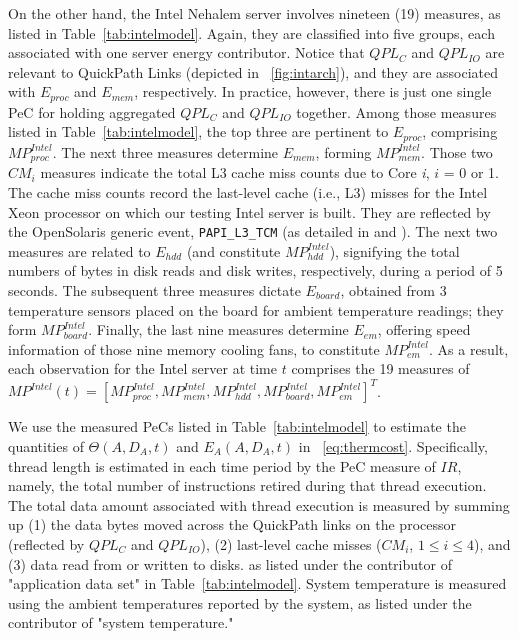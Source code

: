 On the other hand, the Intel Nehalem server involves nineteen (19) measures, as
listed in Table~\ref{tab:intelmodel}.  Again, they are classified into five
groups, each associated with one server energy contributor.
Notice that $QPL_{C}$ and $QPL_{IO}$ are relevant to QuickPath Links
(depicted in \figurename~\ref{fig:intarch}),
and they are associated with $E_{proc}$ and $E_{mem}$, respectively.
In practice, however, there is just one single PeC for holding aggregated
$QPL_{C}$ and $QPL_{IO}$ together.
Among those measures listed in Table~\ref{tab:intelmodel},
the top three are pertinent to $E_{proc}$, comprising $MP_{proc}^{Intel}$.
The next three measures determine $E_{mem}$, forming $MP_{mem}^{Intel}$.
Those two $CM_{i}$ measures indicate the total L3 cache miss counts
due to Core \textit{i}, $i$ = 0 or 1.
The cache miss counts record the last-level cache (i.e., L3) misses
for the Intel Xeon processor on which our testing Intel
server is built.  They are reflected by the OpenSolaris generic event,
\texttt{PAPI\_L3\_TCM} (as detailed in \cite{Sun2008b} and \cite{Intel2009}).
The next two measures are related to $E_{hdd}$ (and constitute $MP_{hdd}^{Intel}$),
signifying the total numbers of bytes in disk reads and disk writes,
respectively, during a period of 5 seconds.
The subsequent three measures dictate $E_{board}$, obtained
from 3 temperature sensors placed on the board for ambient temperature readings;
they form $MP_{board}^{Intel}$.
Finally, the last nine measures determine $E_{em}$, offering speed
information of those nine memory cooling fans, to constitute $MP_{em}^{Intel}$.
As a result, each observation for the Intel server at time $t$ comprises the 19 measures of
$MP^{Intel}(t) =\left[MP_{proc}^{Intel}, MP_{mem}^{Intel}, MP_{hdd}^{Intel}, MP_{board}^{Intel}, MP_{em}^{Intel}\right]^{T}$.

We use the measured PeCs listed in Table~\ref{tab:intelmodel} to
estimate the quantities of $\Theta(A, D_{A}, t)$ and $E_{A}(A, D_{A},
t)$ in \equationname~\eqref{eq:thermcost}.  Specifically, thread length
is estimated in each time period by the PeC measure of $IR$, namely, the
total number of instructions retired during that thread execution.  The
total data amount associated with thread execution is measured by
summing up (1) the data bytes moved across the QuickPath links on the
processor (reflected by $QPL_{C}$ and $QPL_{IO}$), (2) last-level cache
misses ($CM_{i}$, $1\leq i \leq 4$), and (3) data read from or written
to disks.  as listed under the contributor of "application data set" in
Table~\ref{tab:intelmodel}.  System temperature is measured using the
ambient temperatures reported by the system, as listed under the
contributor of "system temperature."

